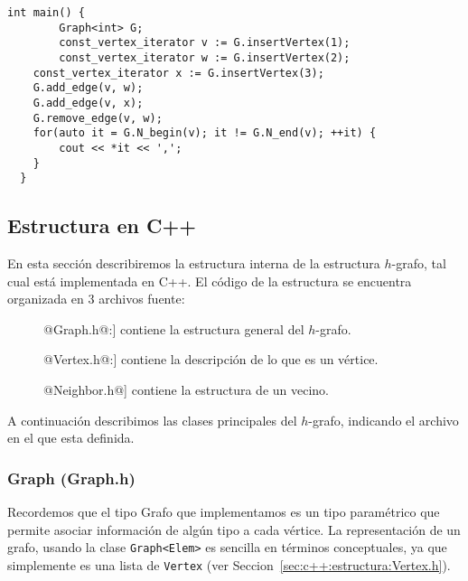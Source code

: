 \documentclass[%
    a4paper,%
    12pt,%
    twoside,%
    openright,%
    halfparskip,%
    cleardoubleempty,%
    bigheadings,%
    titlepage,%
    headsepline%
]{scrbook}
\makeatletter
\newcommand{\Code}[1]{\lstinline[basicstyle={\tt}]@#1@}
\makeatother
\begin{document}
\begin{lstlisting}[caption={Ejemplo de uso de \Code{remove_edge}.  Reescribimos el pseudocódigo ~\ref{lst:pseudo:remove_edge} a c++.  En el código se crea un grafo $G$ con vértices $v$, $w$ y $x$, siendo $v$ adyacente tanto a $w$ como a $x$.  Luego se utiliza \Code{remove_edge} para eliminar la arista $vw$, con lo cual $v$ queda adyacente únicamente a $x$.  El ciclo final, pues, imprime el valor $3$ asociado a $x$.  Ver Sección~\ref{sec:neighbor iterator} para más información de \Code{neighbor_iterator}.},gobble=2,float=ht,label={lst:remove_edge},emph={remove_edge}]
  int main() {
        Graph<int> G;
        const_vertex_iterator v := G.insertVertex(1);
        const_vertex_iterator w := G.insertVertex(2);
    const_vertex_iterator x := G.insertVertex(3);
    G.add_edge(v, w);
    G.add_edge(v, x);
    G.remove_edge(v, w);
    for(auto it = G.N_begin(v); it != G.N_end(v); ++it) {
        cout << *it << ',';
    }
  }
\end{lstlisting}











\subsection{Estructura en C++}
\label{sec:c++:estructura}

En esta sección describiremos la estructura interna de la estructura $h$-grafo, tal cual está implementada en C++.  El código de la estructura se encuentra organizada en 3 archivos fuente:
\begin{description}
  \item[\Code{Graph.h}:] contiene la estructura general del $h$-grafo.
  \item[\Code{Vertex.h}:] contiene la descripción de lo que es un vértice.
  \item[\Code{Neighbor.h}] contiene la estructura de un vecino.
\end{description}
A continuación describimos las clases principales del $h$-grafo, indicando el archivo en el que esta definida.

\subsubsection{Graph (Graph.h)}
\label{sec:c++:estructura:Graph.h}

Recordemos que el tipo Grafo que implementamos es un tipo paramétrico que permite asociar información de algún tipo a cada vértice.  La representación de un grafo, usando la clase \Code{Graph<Elem>} es sencilla en términos conceptuales, ya que simplemente es una lista de \Code{Vertex} (ver Seccion~\ref{sec:c++:estructura:Vertex.h}).  
\end{document}
